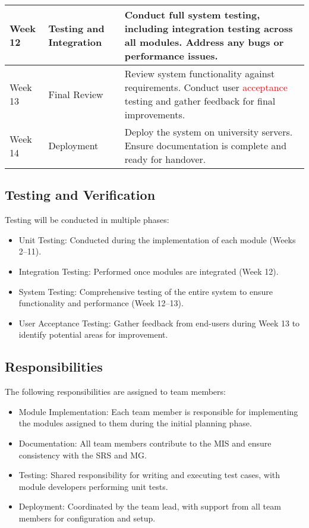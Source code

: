 \documentclass[12pt, titlepage]{article}
\begin{document}
\begin{tabularx}{\textwidth}{|l|l|X|}
\hline
Week 12 & Testing and Integration & Conduct full system testing, including integration testing across all modules. Address any bugs or performance issues. \\
\hline
Week 13 & Final Review & Review system functionality against requirements. Conduct user \textcolor{red}{acceptance} testing and gather feedback for final improvements. \\
\hline
Week 14 & Deployment & Deploy the system on university servers. Ensure documentation is complete and ready for handover. \\
\hline
\end{tabularx}

\subsection{Testing and Verification}
Testing will be conducted in multiple phases:
\begin{itemize}
    \item Unit Testing: Conducted during the implementation of each module (Weeks 2–11).
    \item Integration Testing: Performed once modules are integrated (Week 12).
    \item System Testing: Comprehensive testing of the entire system to ensure functionality and performance (Week 12–13).
    \item User Acceptance Testing: Gather feedback from end-users during Week 13 to identify potential areas for improvement.
\end{itemize}

\subsection{Responsibilities}
The following responsibilities are assigned to team members:
\begin{itemize}
    \item Module Implementation: Each team member is responsible for implementing the modules assigned to them during the initial planning phase.
    \item Documentation: All team members contribute to the MIS and ensure consistency with the SRS and MG.
    \item Testing: Shared responsibility for writing and executing test cases, with module developers performing unit tests.
    \item Deployment: Coordinated by the team lead, with support from all team members for configuration and setup.
\end{itemize}
\end{document}
